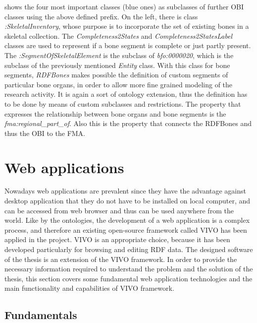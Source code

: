  shows the four most important classes (blue ones) as subclasses of further OBI classes using the above defined prefix. On the left, there is class \textit{:SkeletalInventory}, whose purpose is to incorporate the set of existing bones in a skeletal collection. The \textit{Completeness2States} and \textit{Completeness2StatesLabel} classes are used to represent if a bone segment is complete or just partly present. The \textit{:SegmentOfSkeletalElement} is the subclass of \textit{bfo:0000020}, which is the subclass of the previously mentioned \textit{Entity} class. With this class for bone segments, \textit{RDFBones} makes possible the definition of custom segments of particular bone organs, in order to allow more fine grained modeling of the research activity. It is again a sort of ontology extension, thus the definition has to be done by means of custom subclasses and restrictions. The property that expresses the relationship between bone organs and bone segments is the \textit{fma:regional\_part\_of}. Also this is the property that connects the RDFBones and thus the OBI to the FMA.



\section{Web applications}

Nowadays web applications are prevalent since they have the advantage against desktop application that they do not have to be installed on local computer, and can be accessed from web browser and thus can be used anywhere from the world. Like by the ontologies, the development of a web application is a complex process, and therefore an existing open-source framework called VIVO has been applied in the project. VIVO is an appropriate choice, because it has been developed particularly for browsing and editing RDF data.  The designed software of the thesis is an extension of the VIVO framework. In order to provide the necessary information required to understand the problem and the solution of the thesis, this section covers some fundamental web application technologies and the main functionality and capabilities of VIVO framework.


\subsection{Fundamentals} \label{fundamentals}

